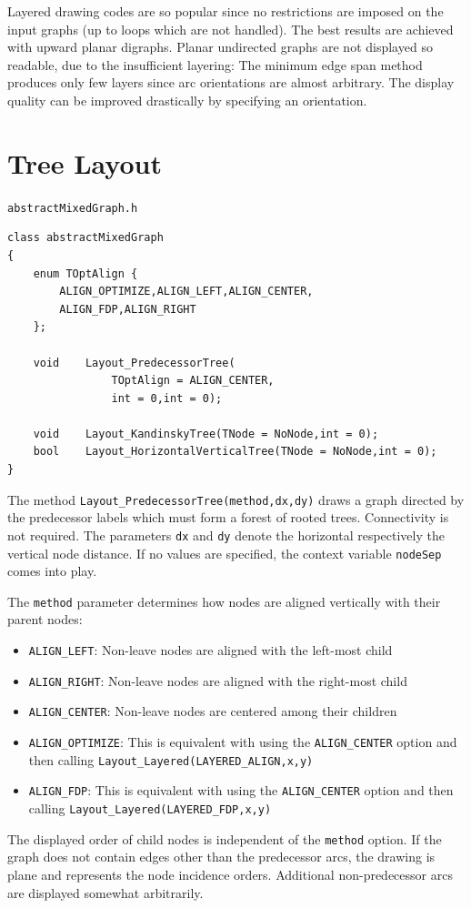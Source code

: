 \documentclass[a4paper,11pt,twoside]{book}
\begin{document}
\begin{multicols}{2}
Layered drawing codes are so popular since no restrictions are imposed on the
input graphs (up to loops which are not handled). The best results are achieved
with upward planar digraphs. Planar undirected graphs are not displayed so
readable, due to the insufficient layering: The minimum edge span method produces
only few layers since arc orientations are almost arbitrary. The display quality
can be improved drastically by specifying an orientation.


\section{Tree Layout}
\label{slb_tree_layout}
\myinclude\verb/abstractMixedGraph.h/
\begin{mymethods}
\begin{verbatim}
class abstractMixedGraph
{
    enum TOptAlign {
        ALIGN_OPTIMIZE,ALIGN_LEFT,ALIGN_CENTER,
        ALIGN_FDP,ALIGN_RIGHT
    };

    void    Layout_PredecessorTree(
                TOptAlign = ALIGN_CENTER,
                int = 0,int = 0);

    void    Layout_KandinskyTree(TNode = NoNode,int = 0);
    bool    Layout_HorizontalVerticalTree(TNode = NoNode,int = 0);
}
\end{verbatim}
\end{mymethods}
The method \verb/Layout_PredecessorTree(method,dx,dy)/ draws a graph directed
by the predecessor labels which must form a forest of rooted trees.
Connectivity is not required. The parameters \verb/dx/ and \verb/dy/ denote
the horizontal respectively the vertical node distance. If no values are
specified, the context variable \verb/nodeSep/ comes into play.

The \verb/method/ parameter determines how nodes are aligned vertically with
their parent nodes:
\begin{itemize}
\item \verb/ALIGN_LEFT/: Non-leave nodes are aligned with the left-most child
\item \verb/ALIGN_RIGHT/: Non-leave nodes are aligned with the right-most child
\item \verb/ALIGN_CENTER/: Non-leave nodes are centered among their children
\item \verb/ALIGN_OPTIMIZE/: This is equivalent with using the \verb/ALIGN_CENTER/
    option and then calling \verb/Layout_Layered(LAYERED_ALIGN,x,y)/
\item \verb/ALIGN_FDP/: This is equivalent with using the \verb/ALIGN_CENTER/
    option and then calling \verb/Layout_Layered(LAYERED_FDP,x,y)/
\end{itemize}
The displayed order of child nodes is independent of the \verb/method/ option.
If the graph does not contain edges other than the predecessor arcs, the drawing
is plane and represents the node incidence orders. Additional non-predecessor
arcs are displayed somewhat arbitrarily.


\end{multicols}
\end{document}
